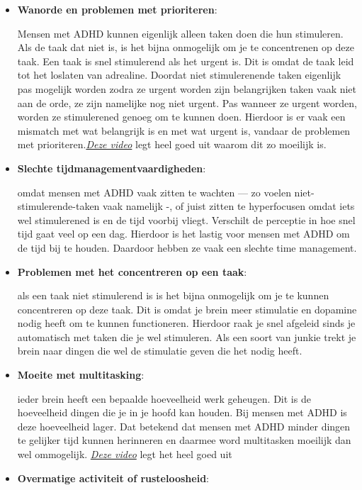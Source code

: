 \documentclass{article}
\begin{document}
                    \begin{itemize}

                        \item \textbf{Wanorde en problemen met prioriteren}: 

                            Mensen met ADHD kunnen eigenlijk alleen taken doen die hun stimuleren. Als de taak dat niet is, is het bijna onmogelijk om je te concentrenen op deze taak. Een taak is snel stimulerend als het urgent is. Dit is omdat de taak leid tot het loslaten van adrealine. Doordat niet stimulerenende taken eigenlijk pas mogelijk worden zodra ze urgent worden zijn belangrijken taken vaak niet aan de orde, ze zijn namelijke nog niet urgent. Pas wanneer ze urgent worden, worden ze stimulerened genoeg om te kunnen doen. Hierdoor is er vaak een mismatch met wat belangrijk is en met wat urgent is, vandaar de problemen met prioriteren.\emph{\hyperlink{https://www.youtube.com/watch?v=5xbD9t8cM4M}{Deze video}}\cite{ADHD-video-prioriteiten} legt heel goed uit waarom dit zo moeilijk is.

                        \item \textbf{Slechte tijdmanagementvaardigheden}: 

                            omdat mensen met ADHD vaak zitten te wachten — zo voelen niet-stimulerende-taken vaak namelijk -, of juist zitten te hyperfocusen omdat iets wel stimulerened is en de tijd voorbij vliegt. Verschilt de perceptie in hoe snel tijd gaat veel op een dag. Hierdoor is het lastig voor mensen met ADHD om de tijd bij te houden. Daardoor hebben ze vaak een slechte time management. 

                        \item \textbf{Problemen met het concentreren op een taak}: 

                            als een taak niet stimulerend is is het bijna onmogelijk om je te kunnen concentreren op deze taak. Dit is omdat je brein meer stimulatie en dopamine nodig heeft om te kunnen functioneren. Hierdoor raak je snel afgeleid sinds je automatisch met taken die je wel stimuleren. Als een soort van junkie trekt je brein naar dingen die wel de stimulatie geven die het nodig heeft.

                        \item \textbf{Moeite met multitasking}: 

                            ieder brein heeft een bepaalde hoeveelheid werk geheugen. Dit is de hoeveelheid dingen die je in je hoofd kan houden. Bij mensen met ADHD is deze hoeveelheid lager. Dat betekend dat mensen met ADHD minder dingen te gelijker tijd kunnen herinneren en daarmee word multitasken moeilijk dan wel ommogelijk. \emph{\hyperlink{https://www.youtube.com/watch?v=HszXKZO_H18&ab_channel=HowtoADHD}{Deze video}}\cite{ADHD-video-working-memory} legt het heel goed uit
                        \item \textbf{Overmatige activiteit of rusteloosheid}: 


\end{itemize}
\end{document}
